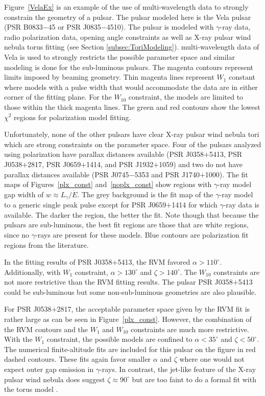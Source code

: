 Figure~\ref{VelaEx} is an
example of the use of 
multi-wavelength data to strongly 
constrain the geometry of 
a pulsar.  
The pulsar modeled here is the Vela pulsar (PSR B0833$-$45 or PSR J0835$-$4510).
The pulsar is modeled with $\gamma$-ray data,
radio polarization data, opening angle constraints as
well as X-ray pulsar wind nebula torus fitting 
(see Section \ref{subsec:ToriModeling}).
multi-wavelength data of Vela is used to strongly restricts the possible
parameter space and similar modeling is done for the sub-luminous pulsars.
The magenta contours represent limits
imposed by beaming geometry.  Thin magenta lines represent
$W_{1}$ constant where models with a pulse width
that would accommodate the data are in either corner of the
fitting plane.  For the $W_{10}$ constraint, the models
are limited to those within the thick magenta lines.
The green and red contours show the lowest $\chi^2$ regions
for polarization model fitting.

Unfortunately, none of the other pulsars have clear 
X-ray pulsar wind nebula tori which are strong constraints
on the parameter space.
Four of the pulsars analyzed using polarization have parallax distances available
(PSR J0358$+$5413, PSR J0538$+$2817, PSR J0659$+$1414, and PSR J1932$+$1059) 
and two do not have parallax distances available (PSR J0745$-$5353 and PSR J1740$+$1000).
The fit maps of Figures~\ref{plx_const} and~\ref{noplx_const} show
regions with $\gamma$-ray model gap width of $w\approx L_{\gamma}/\dot{E}$.
The grey background is the fit map of the $\gamma$-ray model to 
a generic single peak pulse except for PSR J0659$+$1414 for which $\gamma$-ray data is
available.  The darker the region, the better the fit.  
Note though that because the pulsars are sub-luminous, the best fit regions
are those that are white regions, since no $\gamma$-rays are present
for these models. 
Blue contours are polarization fit
regions from the literature.  

In the fitting results of PSR J0358$+$5413, the RVM favored $\alpha>110^\circ$.
Additionally, with $W_1$ constraint, $\alpha>130^\circ$ and $\zeta>140^\circ$.
The $W_{10}$ constraints are not more restrictive than the RVM fitting
results.
The pulsar PSR J0358$+$5413 could be sub-luminous but 
some non-sub-luminous geometries are also plausible.

For PSR J0538$+$2817,
the acceptable parameter space given by the
RVM fit is rather large as can be seen in 
Figure~\ref{plx_const}.  However, the combination
of the RVM contours and the $W_{1}$ and $W_{10}$ constraints
are much more restrictive.  With the $W_{1}$ constraint,
the possible models are confined to $\alpha<35^\circ$
and $\zeta<50^\circ$.  The numerical finite-altitude 
fits are included for this pulsar
on the figure in red dashed contours.  These fits
again favor smaller $\alpha$ and $\zeta$ where
one would not expect outer gap emission in $\gamma$-rays.
In contrast, the jet-like feature of the X-ray pulsar
wind nebula does suggest $\zeta\approx90^\circ$
but are too faint to do a formal fit with the torus model
\citep{romani2003pulsar,ng2007origin}.


